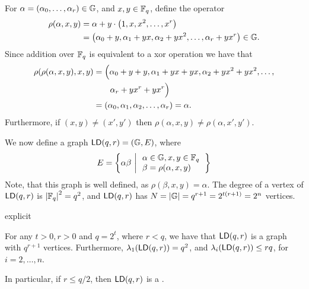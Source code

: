 For $\alpha  = (\alpha_0,\ldots, \alpha_r) \in \mathbb{G}$, and $x,y \in
\mathbb{F}_q$, define the operator
\begin{align*}
\rho(\alpha,x,y) &= \alpha + y \cdot\pth{ 1, x, x^2, \ldots, x^r} \\
&=
\pth{\alpha_0 + y, \alpha_1 + y x, \alpha_2 + y x^2, \ldots, \alpha_r+
   y x^r} \in \LSpace.
\end{align*}
Since addition over $\mathbb{F}_q$ is equivalent to a x{o}r operation we
have that 
\begin{align*}
    \rho\pth{\MakeBig \rho(\alpha,x,y), x, y} &= \Bigl(\alpha_0 + y +
       y, \alpha_1 + y x + yx, \alpha_2 + y x^2+yx^2, \ldots,\\
       &\qquad \alpha_r+ y
       x^r+yx^r\Bigr)\\
    &= \pth{\alpha_0, \alpha_1, \alpha_2, \ldots, \alpha_r} = \alpha.
\end{align*}
Furthermore, if $(x,y) \ne (x',y')$ then $\rho(\alpha,x,y) \ne
\rho(\alpha,x',y')$.

We now define a graph $\LD{q}{r}=\pth{\LSpace, E}$, where
\[
E= \left\{ { \alpha \beta \,\left|\, { \begin{array}{l}
          \alpha \in \mathbb{G}, x, y \in \mathbb{F}_q\\
          \beta = \rho(\alpha,x,y)
          \end{array}} \bigr.\right.} \right\}
\]
Note, that this graph is well defined, as $\rho(\beta,x,y)
=\alpha$. The degree of a vertex of $\LD{q}{r}$ is
$\left| {\mathbb{F}_q} \right|^2 = q^2$, and $\LD{q}{r}$ has $N = \left| {\mathbb{G}} \right|
= q^{r+1} = 2^{t(r+1)}=2^n$ vertices.

\begin{fragment}{explicit}
\begin{theorem}
    For any $t > 0, r>0$ and $q = 2^t$, where $r<q$, we have that
    $\LD{q}{r}$ is a graph with $q^{r+1}$ vertices. Furthermore,
    $\lambda_1\pth{\LD{q}{r}} = q^2$, and $\lambda_i\pth{\LD{q}{r}}
    \leq rq$, for $i=2,\ldots, n$.

    In particular, if $r \leq q/2$, then $\LD{q}{r}$ is a
    .

\end{theorem}
\end{fragment}

